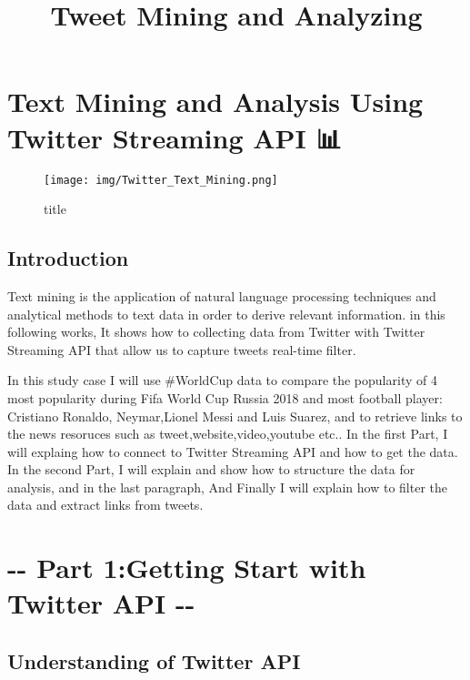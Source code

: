 \documentclass[11pt]{article}
\title{Tweet Mining and Analyzing}
\makeatletter
\def\maxwidth{\ifdim\Gin@nat@width>\linewidth\linewidth
    \else\Gin@nat@width\fi}
\let\Oldincludegraphics\includegraphics
\renewcommand{\includegraphics}[1]{\Oldincludegraphics[width=.8\maxwidth]{#1}}
\makeatother
\begin{document}
    
    
    \maketitle
    
    

    
    \section{Text Mining and Analysis Using Twitter Streaming API
📊}\label{text-mining-and-analysis-using-twitter-streaming-api}

    \begin{figure}
\centering
\texttt{[image: img/Twitter\_Text\_Mining.png]}
\caption{title}
\end{figure}

    \subsection{Introduction}\label{introduction}

Text mining is the application of natural language processing techniques
and analytical methods to text data in order to derive relevant
information. in this following works, It shows how to collecting data
from Twitter with Twitter Streaming API that allow us to capture tweets
real-time filter.

    In this study case I will use \#WorldCup data to compare the popularity
of 4 most popularity during Fifa World Cup Russia 2018 and most football
player: Cristiano Ronaldo, Neymar,Lionel Messi and Luis Suarez, and to
retrieve links to the news resoruces such as tweet,website,video,youtube
etc.. In the first Part, I will explaing how to connect to Twitter
Streaming API and how to get the data. In the second Part, I will
explain and show how to structure the data for analysis, and in the last
paragraph, And Finally I will explain how to filter the data and extract
links from tweets.

    \section{-\/- Part 1:Getting Start with Twitter API
-\/-}\label{part-1getting-start-with-twitter-api---}

    \subsection{Understanding of Twitter
API}\label{understanding-of-twitter-api}
\end{document}
